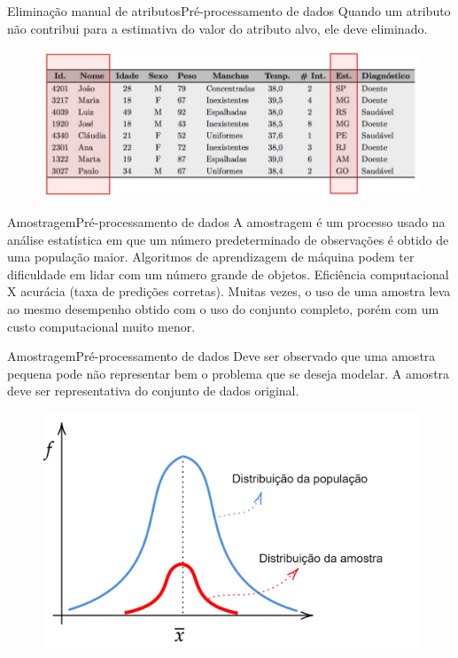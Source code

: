 \documentclass[t]{beamer}
\begin{document}
\begin{ftst}{Eliminação manual de atributos}{Pré-processamento de dados}
\justifying
Quando um atributo não contribui para a estimativa do valor do atributo alvo, ele deve eliminado.
\vone
\begin{figure}
    \centering
    \includegraphics[scale=0.5]{Figuras/slide02_01.jpg}
\end{figure}

\end{ftst}


\begin{ftst}{Amostragem}{Pré-processamento de dados}
\justifying
A amostragem é um processo usado na análise estatística em que um número predeterminado de observações é obtido de uma população maior.
\vone
Algoritmos de aprendizagem de máquina podem ter dificuldade em lidar com um número grande de objetos.
\vone
Eficiência computacional X acurácia (taxa de predições corretas).
\vone
Muitas vezes, o uso de uma amostra leva ao mesmo desempenho obtido com o uso do conjunto completo, porém com um custo computacional muito menor.

\end{ftst}


\begin{ftst}{Amostragem}{Pré-processamento de dados}
\justifying
Deve ser observado que uma amostra pequena pode não representar bem o problema que se deseja modelar.
\vone
A amostra deve ser representativa do conjunto de dados original.

\begin{figure}
    \centering
    \includegraphics[scale=0.17]{Figuras/slide02_02.png}
\end{figure}

\end{ftst}
\end{document}
